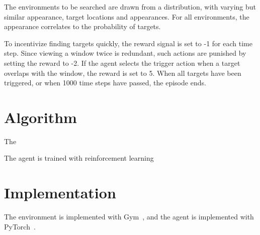 The environments to be searched are drawn from a distribution, with varying but similar appearance, target locations and appearances. For all environments, the appearance correlates to the probability of targets.

To incentivize finding targets quickly, the reward signal is set to -1 for each time step. Since viewing a window twice is redundant, such actions are punished by setting the reward to -2. If the agent selects the trigger action when a target overlaps with the window, the reward is set to 5. When all targets have been triggered, or when 1000 time steps have passed, the episode ends.




\section{Algorithm}
\label{sec:algorithm}

The 

The agent is trained with reinforcement learning 




\section{Implementation}

The environment is implemented with Gym~\cite{gym}, and the agent is implemented with PyTorch~\cite{pytorch}. 

